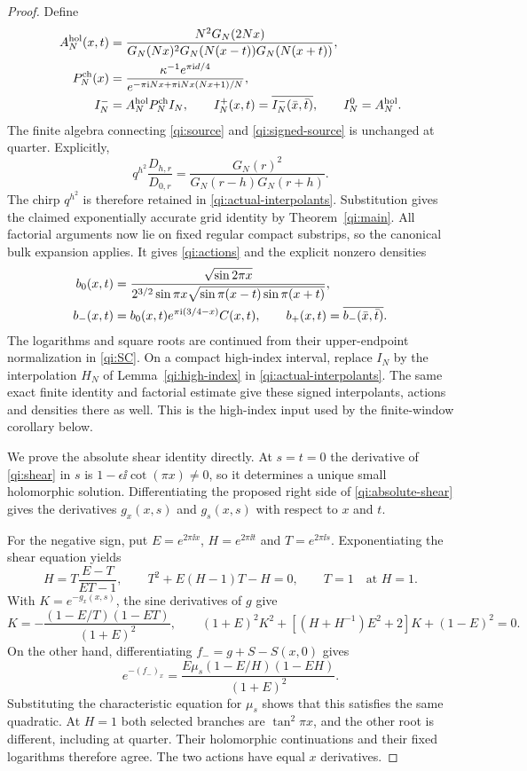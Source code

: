\begin{proof}
Define
\begin{align}
 A_N^{\rm hol}(x,t)
 &=\frac{N^2G_N(2Nx)}
        {G_N(Nx)^2G_N(N(x-t))G_N(N(x+t))},\notag\\
 P_N^{\rm ch}(x)
 &=\frac{\kappa^{-1}e^{\pi\mathrm i d/4}}
        {e^{-\pi\mathrm i Nx+\pi\mathrm i Nx(Nx+1)/N}},\notag\\
 I_N^-&=A_N^{\rm hol}P_N^{\rm ch}I_N,\qquad
 I_N^+(x,t)=\overline{I_N^-(\bar x,\bar t)},\qquad
 I_N^0=A_N^{\rm hol}.\label{qi:actual-interpolants}
\end{align}
The finite algebra connecting \eqref{qi:source} and
\eqref{qi:signed-source} is unchanged at quarter. Explicitly,
\[
 q^{h^2}\frac{D_{h,r}}{D_{0,r}}
   =\frac{G_N(r)^2}{G_N(r-h)G_N(r+h)}.
\]
The chirp $q^{h^2}$ is therefore retained in
\eqref{qi:actual-interpolants}. Substitution gives the claimed exponentially accurate grid identity by Theorem~\ref{qi:main}. All factorial arguments now lie on fixed regular compact substrips, so the canonical bulk expansion \cite[Lemma 2.1]{Conway} applies. It gives \eqref{qi:actions} and the explicit nonzero densities
\begin{align}
 b_0(x,t)&=
 \frac{\sqrt{\sin2\pi x}}
 {2^{3/2}\sin\pi x\sqrt{\sin\pi(x-t)\sin\pi(x+t)}},\notag\\
 b_-(x,t)&=b_0(x,t)e^{\pi\mathrm i(3/4-x)}C(x,t),\qquad
 b_+(x,t)=\overline{b_-(\bar x,\bar t)}.\label{qi:density}
\end{align}
The logarithms and square roots are continued from their upper-endpoint
normalization in \eqref{qi:SC}.
On a compact high-index interval, replace $I_N$ by the interpolation
$H_N$ of Lemma~\ref{qi:high-index} in
\eqref{qi:actual-interpolants}. The same exact finite identity and
factorial estimate give these signed interpolants, actions and
densities there as well. This is the high-index input used by the
finite-window corollary below.

We prove the absolute shear identity directly. At $s=t=0$ the
derivative of \eqref{qi:shear} in $s$ is
$1-\epsilon\ii\cot(\pi x)\ne0$, so it determines a unique small
holomorphic solution. Differentiating the proposed right side of
\eqref{qi:absolute-shear} gives the derivatives $g_x(x,s)$ and
$g_s(x,s)$ with respect to $x$ and $t$.

For the negative sign, put $E=e^{2\pi\ii x}$,
$H=e^{2\pi\ii t}$ and $T=e^{2\pi\ii s}$. Exponentiating the
shear equation yields
\[
 H=T\frac{E-T}{ET-1},\qquad
 T^2+E(H-1)T-H=0,\qquad T=1\quad\text{at }H=1.
\]
With $K=e^{-g_x(x,s)}$, the sine derivatives of $g$ give
\[
 K=-\frac{(1-E/T)(1-ET)}{(1+E)^2},\qquad
 (1+E)^2K^2+[(H+H^{-1})E^2+2]K+(1-E)^2=0.
\]
On the other hand, differentiating $f_-=g+S-S(x,0)$ gives
\[
 e^{-(f_-)_x}
 =\frac{E\mu_s(1-E/H)(1-EH)}{(1+E)^2}.
\]
Substituting the characteristic equation for $\mu_s$ shows that
this satisfies the same quadratic. At $H=1$ both selected branches
are $\tan^2\pi x$, and the other root is different, including at
quarter. Their holomorphic continuations and their fixed logarithms
therefore agree. The two actions have equal $x$ derivatives.


\end{proof}
